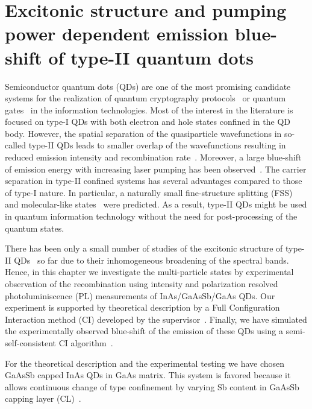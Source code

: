
\chapter{Excitonic structure and pumping power dependent emission blue-shift of type-II quantum dots}
\label{chap:SciRep}


Semiconductor quantum dots (QDs) are one of the most promising candidate systems for the realization of quantum cryptography protocols~\citep{Muller2014,Strauf2007} or quantum gates~\citep{Stevenson2006,Rodt} in the information technologies. Most of the interest in the literature is focused on type-I QDs with both electron and hole states confined in the QD body. 
However, the spatial separation of the quasiparticle wavefunctions in so-called type-II QDs leads to smaller overlap of the wavefunctions resulting in reduced emission intensity and recombination rate~\citep{Klenovsky10,KleJOPCS,Hsu,Nishikawa2012}. Moreover, a large blue-shift of emission energy with increasing laser pumping has been observed~\citep{Jin,UlloaHomogSRL}. The carrier separation in type-II confined systems has several advantages compared to those of type-I nature. In particular, a naturally small fine-structure splitting (FSS)~\citep{Krapek2015} and molecular-like states~\citep{Klenovsky10,KleJOPCS,KrapekNottingham} were predicted. As a result, type-II QDs might be used in quantum information technology without the need for post-processing of the quantum states. 

There has been only a small number of studies of the excitonic structure of type-II QDs~\citep{Matsuda2007,Miloszewski2014} so far due to their inhomogeneous broadening of the spectral bands. Hence, in this chapter we investigate the multi-particle states by experimental observation of the recombination using intensity and polarization resolved photoluminiscence (PL) measurements of InAs/GaAsSb/GaAs QDs. Our experiment is supported by theoretical description by a Full Configuration Interaction method (CI) developed by the supervisor~\citep{Klenovsky2017}. Finally, we have simulated the experimentally observed blue-shift of the emission of these QDs using a semi-self-consistent CI algorithm~\citep{Klenovsky2017}.

\medskip
For the theoretical description and the experimental testing we have chosen GaAsSb capped InAs QDs in GaAs matrix. This system is favored because it allows continuous change of type confinement by varying Sb content in GaAsSb capping layer (CL)~\citep{Klenovsky10}.

